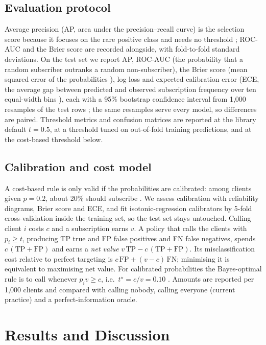 \documentclass[conference]{IEEEtran}
\begin{document}
\subsection{Evaluation protocol}
Average precision (AP, area under the precision--recall curve) is the selection score because it focuses on the rare positive class and needs no threshold \cite{saito2015}; ROC-AUC and the Brier score are recorded alongside, with fold-to-fold standard deviations. On the test set we report AP, ROC-AUC (the probability that a random subscriber outranks a random non-subscriber), the Brier score (mean squared error of the probabilities \cite{brier1950}), log loss and expected calibration error (ECE, the average gap between predicted and observed subscription frequency over ten equal-width bins \cite{naeini2015}), each with a 95\% bootstrap confidence interval from 1,000 resamples of the test rows \cite{efron1993}; the same resamples serve every model, so differences are paired. Threshold metrics and confusion matrices are reported at the library default $t=0.5$, at a threshold tuned on out-of-fold training predictions, and at the cost-based threshold below.

\subsection{Calibration and cost model}
A cost-based rule is only valid if the probabilities are calibrated: among clients given $p=0.2$, about 20\% should subscribe \cite{niculescu2005}. We assess calibration with reliability diagrams, Brier score and ECE, and fit isotonic-regression calibrators \cite{zadrozny2002} by 5-fold cross-validation inside the training set, so the test set stays untouched. Calling client $i$ costs $c$ and a subscription earns $v$. A policy that calls the clients with $p_i\ge t$, producing TP true and FP false positives and FN false negatives, spends $c\,(\mathrm{TP}+\mathrm{FP})$ and earns a \emph{net value} $v\,\mathrm{TP}-c\,(\mathrm{TP}+\mathrm{FP})$. Its misclassification cost relative to perfect targeting is $c\,\mathrm{FP}+(v-c)\,\mathrm{FN}$; minimising it is equivalent to maximising net value. For calibrated probabilities the Bayes-optimal rule is to call whenever $p_i v\ge c$, i.e.\ $t^\star=c/v=0.10$ \cite{elkan2001}. Amounts are reported per 1,000 clients and compared with calling nobody, calling everyone (current practice) and a perfect-information oracle.

\section{Results and Discussion}
\end{document}
